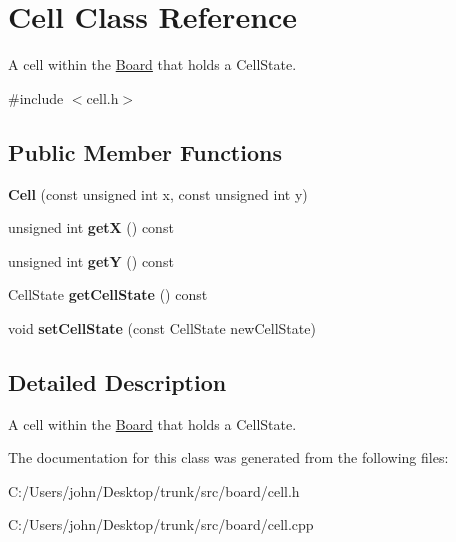 \hypertarget{class_cell}{}\section{Cell Class Reference}
\label{class_cell}


A cell within the \hyperlink{class_board}{Board} that holds a Cell\+State.  




{\ttfamily \#include $<$cell.\+h$>$}

\subsection*{Public Member Functions}
\begin{DoxyCompactItemize}
\item 
{\bfseries Cell} (const unsigned int x, const unsigned int y)\hypertarget{class_cell_a595ac477f5ff12eeffa423c5f2d55e81}{}\label{class_cell_a595ac477f5ff12eeffa423c5f2d55e81}

\item 
unsigned int {\bfseries getX} () const \hypertarget{class_cell_aa986a7445f2e71a7c46e232435555e43}{}\label{class_cell_aa986a7445f2e71a7c46e232435555e43}

\item 
unsigned int {\bfseries getY} () const \hypertarget{class_cell_a0b95247e834719b1e67a01fb1494f1bc}{}\label{class_cell_a0b95247e834719b1e67a01fb1494f1bc}

\item 
Cell\+State {\bfseries get\+Cell\+State} () const \hypertarget{class_cell_a915474879b5063a8b635078fa0ae6e98}{}\label{class_cell_a915474879b5063a8b635078fa0ae6e98}

\item 
void {\bfseries set\+Cell\+State} (const Cell\+State new\+Cell\+State)\hypertarget{class_cell_a0c15d367b3df1ef26b08340693c741d1}{}\label{class_cell_a0c15d367b3df1ef26b08340693c741d1}

\end{DoxyCompactItemize}


\subsection{Detailed Description}
A cell within the \hyperlink{class_board}{Board} that holds a Cell\+State. 

The documentation for this class was generated from the following files\+:\begin{DoxyCompactItemize}
\item 
C\+:/\+Users/john/\+Desktop/trunk/src/board/cell.\+h\item 
C\+:/\+Users/john/\+Desktop/trunk/src/board/cell.\+cpp\end{DoxyCompactItemize}
